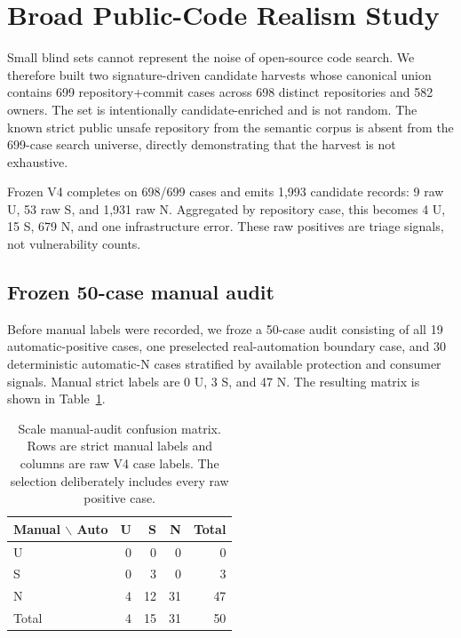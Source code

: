 \documentclass[sigconf,review,anonymous]{acmart}
\newcommand{\U}{\textsf{U}}
\newcommand{\Ssafe}{\textsf{S}}
\newcommand{\N}{\textsf{N}}
\begin{document}
\section{Broad Public-Code Realism Study}
\label{sec:scale}

Small blind sets cannot represent the noise of open-source code search.  We
therefore built two signature-driven candidate harvests whose canonical union
contains 699 repository+commit cases across 698 distinct repositories and 582
owners.  The set is intentionally candidate-enriched and is not random.  The
known strict public unsafe repository from the semantic corpus is absent from
the 699-case search universe, directly demonstrating that the harvest is not
exhaustive.

Frozen V4 completes on 698/699 cases and emits 1,993 candidate records: 9 raw
\U{}, 53 raw \Ssafe{}, and 1,931 raw \N{}.  Aggregated by repository case, this
becomes 4 \U{}, 15 \Ssafe{}, 679 \N{}, and one infrastructure error.  These raw
positives are triage signals, not vulnerability counts.

\subsection{Frozen 50-case manual audit}

Before manual labels were recorded, we froze a 50-case audit consisting of all
19 automatic-positive cases, one preselected real-automation boundary case, and
30 deterministic automatic-\N{} cases stratified by available protection and
consumer signals.  Manual strict labels are 0 \U{}, 3 \Ssafe{}, and 47 \N{}.
The resulting matrix is shown in Table~\ref{tab:matrix}.

\begin{table}[t]
\caption{Scale manual-audit confusion matrix.  Rows are strict manual labels and
columns are raw V4 case labels.  The selection deliberately includes every raw
positive case.}
\label{tab:matrix}
\centering
\small
\begin{tabular}{lrrrr}
\toprule
Manual $\backslash$ Auto & \U{} & \Ssafe{} & \N{} & Total \\
\midrule
\U{} & 0 & 0 & 0 & 0 \\
\Ssafe{} & 0 & 3 & 0 & 3 \\
\N{} & 4 & 12 & 31 & 47 \\
\midrule
Total & 4 & 15 & 31 & 50 \\
\bottomrule
\end{tabular}
\end{table}
\end{document}
